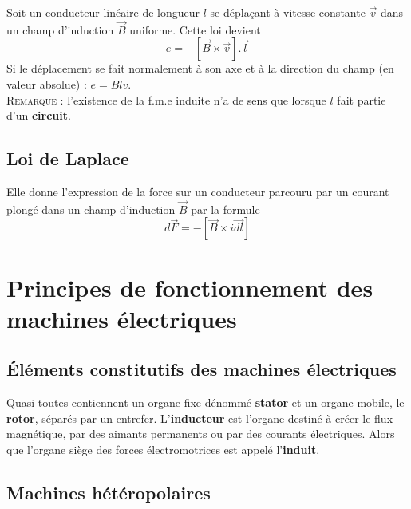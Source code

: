 	Soit un conducteur linéaire de longueur $l$ se 
	déplaçant à vitesse constante $\vec{v}$ dans un champ d'induction $\vec{
	B}$ uniforme. Cette loi devient 
	\begin{equation}
	e = -[\vec{B}\times\vec{v}].\vec{l}
	\label{eq:2.6}
	\end{equation}
	Si le déplacement se fait normalement à son axe et à la direction 
	du champ (en valeur absolue) : $e = Blv$.\\
	\textsc{Remarque :} l'existence de la f.m.e induite n'a de sens que lorsque $l$ fait partie d'un \textbf{circuit}.	
	
	\subsection{Loi de Laplace}
	Elle donne l'expression de la force sur un conducteur parcouru par 
	un courant plongé dans un champ d'induction $\vec{B}$ par la formule 
	\begin{equation}
		d\vec{F} = -[\vec{B}\times i\vec{dl}]
	\end{equation}
	
	
\section{Principes de fonctionnement des machines électriques}
	\subsection{Éléments constitutifs des machines électriques}
	Quasi toutes contiennent un organe fixe dénommé \textbf{stator} 
	et un organe mobile, le \textbf{rotor}, séparés par un entrefer. 
	L'\textbf{inducteur} est l'organe destiné à créer le flux 
	magnétique, par des aimants permanents ou par des courants 
	électriques. Alors que l'organe siège des forces électromotrices est appelé l'\textbf{induit}. 
	
	
	\subsection{Machines hétéropolaires}
